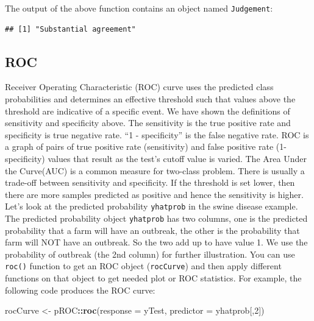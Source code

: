 \documentclass[12pt,]{krantz}
\makeatletter
\newenvironment{Shaded}{\begin{snugshade}}{\end{snugshade}}
\newcommand{\DataTypeTok}[1]{\textcolor[rgb]{0.27,0.27,0.27}{#1}}
\newcommand{\DecValTok}[1]{\textcolor[rgb]{0.06,0.06,0.06}{#1}}
\newcommand{\KeywordTok}[1]{\textcolor[rgb]{0.27,0.27,0.27}{\textbf{#1}}}
\newcommand{\NormalTok}[1]{#1}
\newcommand{\OperatorTok}[1]{\textcolor[rgb]{0.43,0.43,0.43}{\textbf{#1}}}
\newcommand{\StringTok}[1]{\textcolor[rgb]{0.5,0.5,0.5}{#1}}
\newenvironment{kframe}{%
\medskip{}
\setlength{\fboxsep}{.8em}
 \def\at@end@of@kframe{}%
 \ifinner\ifhmode%
  \def\at@end@of@kframe{\end{minipage}}%
  \begin{minipage}{\columnwidth}%
 \fi\fi%
 \def\FrameCommand##1{\hskip\@totalleftmargin \hskip-\fboxsep
 \colorbox{shadecolor}{##1}\hskip-\fboxsep
     \hskip-\linewidth \hskip-\@totalleftmargin \hskip\columnwidth}%
 \MakeFramed {\advance\hsize-\width
   \@totalleftmargin\z@ \linewidth\hsize
   \@setminipage}}%
 {\par\unskip\endMakeFramed%
 \at@end@of@kframe}
\renewenvironment{Shaded}{\begin{kframe}}{\end{kframe}}
\makeatother
\begin{document}
The output of the above function contains an object named \texttt{Judgement}:

\begin{Shaded}
\end{Shaded}

\begin{verbatim}
## [1] "Substantial agreement"
\end{verbatim}

\hypertarget{roc}{%
\subsection{ROC}\label{roc}}

Receiver Operating Characteristic (ROC) curve uses the predicted class probabilities and determines an effective threshold such that values above the threshold are indicative of a specific event. We have shown the definitions of sensitivity and specificity above. The sensitivity is the true positive rate and specificity is true negative rate. ``1 - specificity'' is the false negative rate. ROC is a graph of pairs of true positive rate (sensitivity) and false positive rate (1-specificity) values that result as the test's cutoff value is varied. The Area Under the Curve(AUC) is a common measure for two-class problem. There is usually a trade-off between sensitivity and specificity. If the threshold is set lower, then there are more samples predicted as positive and hence the sensitivity is higher. Let's look at the predicted probability \texttt{yhatprob} in the swine disease example. The predicted probability object \texttt{yhatprob} has two columns, one is the predicted probability that a farm will have an outbreak, the other is the probability that farm will NOT have an outbreak. So the two add up to have value 1. We use the probability of outbreak (the 2nd column) for further illustration. You can use \texttt{roc()} function to get an ROC object (\texttt{rocCurve}) and then apply different functions on that object to get needed plot or ROC statistics. For example, the following code produces the ROC curve:

\begin{Shaded}
\begin{Highlighting}[]
\NormalTok{rocCurve <-}\StringTok{ }\NormalTok{pROC}\OperatorTok{::}\KeywordTok{roc}\NormalTok{(}\DataTypeTok{response =}\NormalTok{ yTest,}
              \DataTypeTok{predictor =}\NormalTok{ yhatprob[,}\DecValTok{2}\NormalTok{])}
\end{Highlighting}
\end{Shaded}
\end{document}
